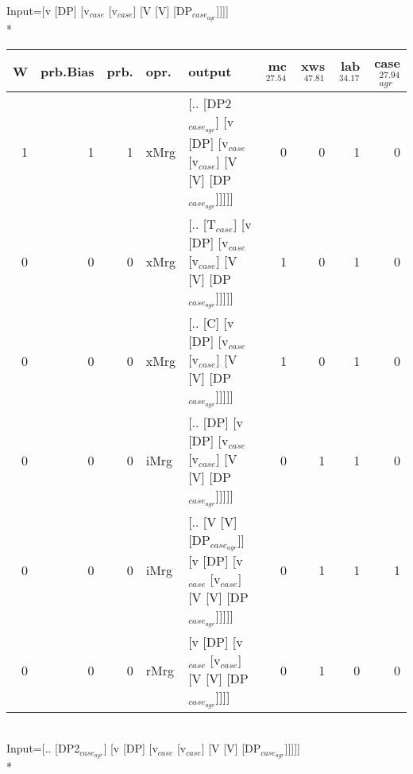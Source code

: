 \begingroup\scriptsize Input=[v [DP] [v$_{case}$ [v$_{case}$] [V [V] [DP$_{case_{agr}}$]]]]\\*
\begin{tabularx}{\linewidth}{rrrlXrrrr}
\hline
   W &   prb.Bias &   prb. & opr.   & output                                                                      &   mc$^{27.54}$ &   xws$^{47.81}$ &   lab$^{34.17}$ &   case$_{agr}^{27.94}$ \\
\hline
   1 &       1 &   1 & xMrg & [.. [DP2$_{case_{agr}}$] [v [DP] [v$_{case}$ [v$_{case}$] [V [V] [DP$_{case_{agr}}$]]]]]        &            0 &             0 &             1 &                  0 \\
   0 &       0 &   0 & xMrg & [.. [T$_{case}$] [v [DP] [v$_{case}$ [v$_{case}$] [V [V] [DP$_{case_{agr}}$]]]]]              &            1 &             0 &             1 &                  0 \\
   0 &       0 &   0 & xMrg & [.. [C] [v [DP] [v$_{case}$ [v$_{case}$] [V [V] [DP$_{case_{agr}}$]]]]]                   &            1 &             0 &             1 &                  0 \\
   0 &       0 &   0 & iMrg & [.. [DP] [v [DP] [v$_{case}$ [v$_{case}$] [V [V] [DP$_{case_{agr}}$]]]]]                  &            0 &             1 &             1 &                  0 \\
   0 &       0 &   0 & iMrg & [.. [V [V] [DP$_{case_{agr}}$]] [v [DP] [v$_{case}$ [v$_{case}$] [V [V] [DP$_{case_{agr}}$]]]]] &            0 &             1 &             1 &                  1 \\
   0 &       0 &   0 & rMrg & [v [DP] [v$_{case}$ [v$_{case}$] [V [V] [DP$_{case_{agr}}$]]]]                            &            0 &             1 &             0 &                  0 \\
\hline
\end{tabularx}\endgroup\\
\begingroup\scriptsize Input=[.. [DP2$_{case_{agr}}$] [v [DP] [v$_{case}$ [v$_{case}$] [V [V] [DP$_{case_{agr}}$]]]]]\\*
